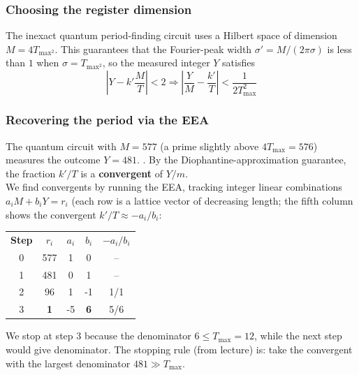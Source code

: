 \subsubsection{Choosing the register dimension}
The inexact quantum period-finding circuit uses a Hilbert space of dimension $M = 4T_{\text{max}^2}$. This guarantees that the Fourier-peak width $\sigma' = M / (2 \pi \sigma)$ is less than $1$ when $\sigma = T_{\text{max}^2}$, so the measured integer $Y$ satisfies
\begin{equation}
    \left| Y - k' \frac{M}{T} \right| < 2 \Rightarrow \left| \frac{Y}{M} -  \frac{k'}{T} \right| < \frac{1}{2T_{\text{max}}^2}
\end{equation}
\noindent{}
\subsubsection{Recovering the period via the EEA}
The quantum circuit with $M = 577$ (a prime slightly above $4T_{\text{max}}=576$) measures the outcome $Y = 481$. . By the Diophantine-approximation guarantee, the fraction $k'/T$ is a \textbf{convergent} of $Y/m$.\\

We find convergents by running the EEA, tracking integer linear combinations $a_iM+b_iY=r_i$  (each row is a lattice vector of decreasing length; the fifth column shows the convergent $k'/T \approx -a_i/b_i$:

\begin{center}
\begin{table}[!h]
\begin{tabular}{ccccc}
\textbf{Step} & $r_i$ & $a_i$ & $b_i$ & $-a_i/b_i$ \\
0 & 577 & 1 & 0 & -- \\
1 & 481 & 0 & 1 & -- \\
2 & 96 & 1 & -1 & 1/1 \\
3 & \textbf{1} & -5 & \textbf{6} & 5/6  
\end{tabular}
\end{table}
\end{center}

We stop at step 3 because the denominator $6 \leq T_{\text{max}} = 12$, while the next step would give denominator. The stopping rule (from lecture) is: take the convergent with the largest denominator $481 \gg T_{\text{max}}$. \\

